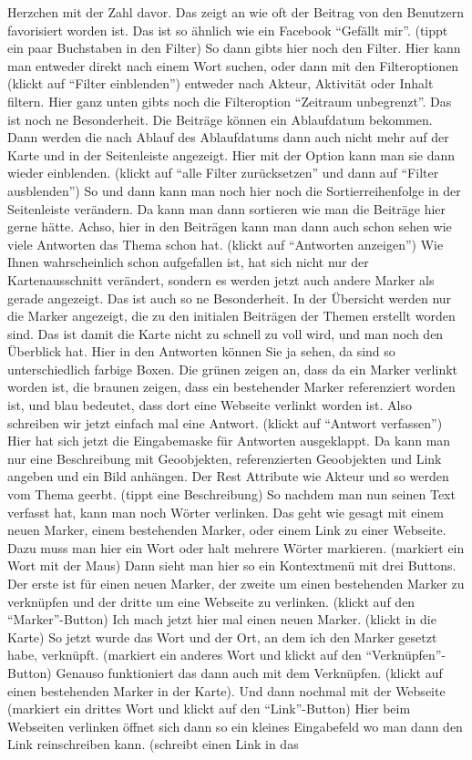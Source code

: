 \begin{itemize}
Herzchen mit der Zahl davor. Das zeigt an wie oft der Beitrag von den Benutzern favorisiert worden ist. Das ist so {\"a}hnlich wie ein Facebook "`Gef{\"a}llt mir"'. (tippt ein paar Buchstaben in den Filter) So dann gibts hier noch den Filter. Hier kann man entweder direkt nach einem Wort suchen, oder dann mit den Filteroptionen (klickt auf "`Filter einblenden"') entweder nach Akteur, Aktivit{\"a}t oder Inhalt filtern. Hier ganz unten gibts noch die Filteroption "`Zeitraum unbegrenzt"'. Das ist noch ne Besonderheit. Die Beitr{\"a}ge k{\"o}nnen ein Ablaufdatum bekommen. Dann werden die nach Ablauf des Ablaufdatums dann auch nicht mehr auf der Karte und in der Seitenleiste angezeigt. Hier mit der Option kann man sie dann wieder einblenden. (klickt auf "`alle Filter zur{\"u}cksetzen"' und dann auf "`Filter ausblenden"') So und dann kann man noch hier noch die Sortierreihenfolge in der Seitenleiste ver{\"a}ndern. Da kann man dann sortieren wie man die Beitr{\"a}ge hier gerne h{\"a}tte. Achso, hier in den Beitr{\"a}gen kann man dann auch schon sehen wie viele Antworten das Thema schon hat. (klickt auf "`Antworten anzeigen"') Wie Ihnen wahrscheinlich schon aufgefallen ist, hat sich nicht nur der Kartenausschnitt ver{\"a}ndert, sondern es werden jetzt auch andere Marker als gerade angezeigt. Das ist auch so ne Besonderheit. In der {\"U}bersicht werden nur die Marker angezeigt, die zu den initialen Beitr{\"a}gen der Themen erstellt worden sind. Das ist damit die Karte nicht zu schnell zu voll wird, und man noch den {\"U}berblick hat. Hier in den Antworten k{\"o}nnen Sie ja sehen, da sind so unterschiedlich farbige Boxen. Die gr{\"u}nen zeigen an, dass da ein Marker verlinkt worden ist, die braunen zeigen, dass ein bestehender Marker referenziert worden ist, und blau bedeutet, dass dort eine Webseite verlinkt worden ist. Also schreiben wir jetzt einfach mal eine Antwort. (klickt auf "`Antwort verfassen"') Hier hat sich jetzt die Eingabemaske f{\"u}r Antworten ausgeklappt. Da kann man nur eine Beschreibung mit Geoobjekten, referenzierten Geoobjekten und Link angeben und ein Bild anh{\"a}ngen. Der Rest Attribute wie Akteur und so werden vom Thema geerbt. (tippt eine Beschreibung) So nachdem man nun seinen Text verfasst hat, kann man noch W{\"o}rter verlinken. Das geht wie gesagt mit einem neuen Marker, einem bestehenden Marker, oder einem Link zu einer Webseite. Dazu muss man hier ein Wort oder halt mehrere W{\"o}rter markieren. (markiert ein Wort mit der Maus) Dann sieht man hier so ein Kontextmen{\"u} mit drei Buttons. Der erste ist f{\"u}r einen neuen Marker, der zweite um einen bestehenden Marker zu verkn{\"u}pfen und der dritte um eine Webseite zu verlinken. (klickt auf den "`Marker"'-Button) Ich mach jetzt hier mal einen neuen Marker. (klickt in die Karte) So jetzt wurde das Wort und der Ort, an dem ich den Marker gesetzt habe, verkn{\"u}pft. (markiert ein anderes Wort und klickt auf den "`Verkn{\"u}pfen"'-Button) Genauso funktioniert das dann auch mit dem Verkn{\"u}pfen. (klickt auf einen bestehenden Marker in der Karte). Und dann nochmal mit der Webseite (markiert ein drittes Wort und klickt auf den "`Link"'-Button) Hier beim Webseiten verlinken {\"o}ffnet sich dann so ein kleines Eingabefeld wo man dann den Link reinschreiben kann. (schreibt einen Link in das 
\end{itemize}
